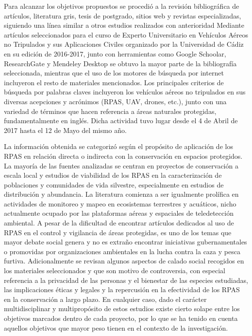 \documentclass[onecolumn]{extarticle}
\begin{document}
Para alcanzar los objetivos propuestos se procedió a la revisión
bibliográfica de artículos, literatura gris, tesis de postgrado, sitios
web y revistas especializadas, siguiendo una línea similar a otros
estudios realizados con anterioridad \citep{Linchant2015, Christie2016}
Mediante artículos seleccionados para el curso de Experto Universitario
en Vehículos Aéreos no Tripulados y sus Aplicaciones Civiles organizado
por la Universidad de Cádiz en su edición de 2016-2017, junto con
herramientas como Google Schoolar, ResearchGate y Mendeley Desktop se
obtuvo la mayor parte de la bibliografía seleccionada, mientras que el
uso de los motores de búsqueda por internet incluyeron el resto de
materiales mencionados. Los principales criterios de búsqueda por
palabras claves incluyeron los vehículos aéreos no tripulados en sus
diversas acepciones y acrónimos (RPAS, UAV, drones, etc.), junto con una
variedad de términos que hacen referencia a áreas naturales protegidas,
fundamentalmente en inglés. Dicha actividad tuvo lugar desde el 4 de
Abril de 2017 hasta el 12 de Mayo del mismo año.

La información obtenida se categorizó según el propósito de aplicación
de los RPAS en relación directa o indirecta con la conservación en
espacios protegidos. La mayoría de las fuentes analizadas se centran en
proyectos de conservación a escala local y estudios de viabilidad de los
RPAS en la caracterización de poblaciones y comunidades de vida
silvestre, especialmente en estudios de distribución y abundancia. La
literatura comienza a ser igualmente prolífica en actividades de
monitoreo y mapeo en ecosistemas terrestres y acuáticos, nicho
actualmente ocupado por las plataformas aéreas y espaciales de
teledetección ambiental. A pesar de la dificultad de encontrar artículos
dedicados al uso de RPAS en el control y vigilancia de áreas protegidas,
es uno de los temas que mayor debate social genera y no es extraño
encontrar iniciativas gubernamentales o promovidas por organizaciones
ambientales en la lucha contra la caza y pesca furtiva. Adicionalmente
se revisan algunos aspectos de calado social recogidos en los materiales
seleccionados y que son motivo de controversia, con especial referencia
a la privacidad de las personas y el bienestar de las especies
estudiadas, las implicaciones éticas y legales y la repercusión en la
efectividad de los RPAS en la conservación a largo plazo. En cualquier
caso, dado el carácter multidisciplinar y multipropósito de estos
estudios existe cierto solape entre los objetivos marcados dentro de
cada proyecto, por lo que se ha tenido en cuenta aquellos objetivos que
mayor peso tienen en el contexto de la investigación.
\end{document}
